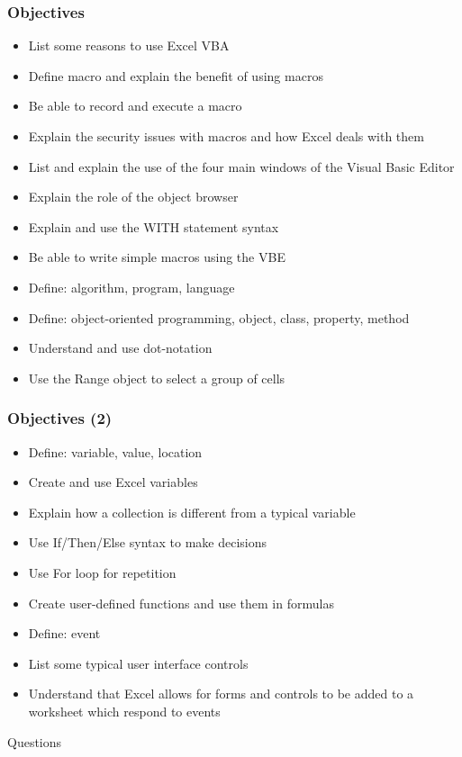 \documentclass[xcolor=svgnames,handout]{beamer}
\newcommand{\ft}[1]{\frametitle{#1}}
\begin{document}
\begin{frame}[fragile]
\ft{Objectives}
\begin{itemize}
\item List some reasons to use Excel VBA
\item Define macro and explain the benefit of using macros
\item Be able to record and execute a macro
\item Explain the security issues with macros and how Excel deals with them
\item List and explain the use of the four main windows of the Visual Basic Editor
\item Explain the role of the object browser
\item Explain and use the WITH statement syntax
\item Be able to write simple macros using the VBE
\item Define: algorithm, program, language
\item Define: object-oriented programming, object, class, property, method
\item Understand and use dot-notation
\item Use the Range object to select a group of cells
\end{itemize}
\end{frame}

\begin{frame}[fragile]
\ft{Objectives (2)}
\begin{itemize}
\item Define: variable, value, location
\item Create and use Excel variables
\item Explain how a collection is different from a typical variable
\item Use If/Then/Else syntax to make decisions
\item Use For loop for repetition
\item Create user-defined functions and use them in formulas
\item Define: event
\item List some typical user interface controls
\item Understand that Excel allows for forms and controls to be added to a worksheet which respond to events
\end{itemize}
\end{frame}


\begin{frame}[label=current]
  {Questions}

  \nocite{lorem,ipsum}
  
  

\end{frame}
\end{document}
